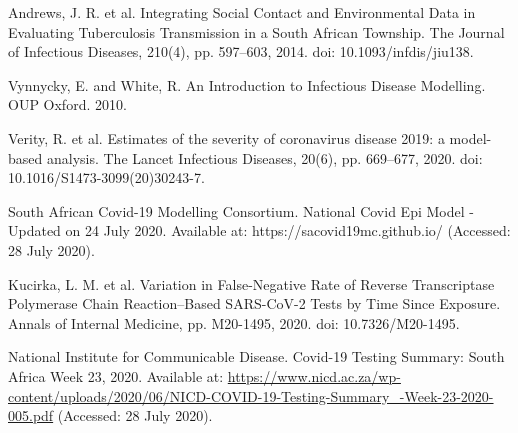 \documentclass{article}
\begin{document}
\begin{thebibliography}{1}
  Andrews, J. R. et al.
  \newblock Integrating Social Contact and Environmental Data in Evaluating Tuberculosis Transmission in a South African Township.
  \newblock The Journal of Infectious Diseases, 210(4), pp. 597–603, 2014.
  \newblock doi: 10.1093/infdis/jiu138.

  Vynnycky, E. and White, R.
  \newblock An Introduction to Infectious Disease Modelling.
  \newblock OUP Oxford. 2010.

  Verity, R. et al.
  \newblock Estimates of the severity of coronavirus disease 2019: a model-based analysis.
  \newblock The Lancet Infectious Diseases, 20(6), pp. 669–677, 2020.
  \newblock doi: 10.1016/S1473-3099(20)30243-7.

  South African Covid-19 Modelling Consortium.
  \newblock National Covid Epi Model - Updated on 24 July 2020.
  \newblock Available at: https://sacovid19mc.github.io/ (Accessed: 28 July 2020).

  Kucirka, L. M. et al.
  \newblock Variation in False-Negative Rate of Reverse Transcriptase Polymerase Chain Reaction–Based SARS-CoV-2 Tests by Time Since Exposure.
  \newblock Annals of Internal Medicine, pp. M20-1495, 2020.
  \newblock doi: 10.7326/M20-1495.

  National Institute for Communicable Disease.
  \newblock Covid-19 Testing Summary: South Africa Week 23, 2020.
  \newblock Available at: \url{https://www.nicd.ac.za/wp-content/uploads/2020/06/NICD-COVID-19-Testing-Summary\_-Week-23-2020-005.pdf} (Accessed: 28 July 2020).

\end{thebibliography}
\end{document}
